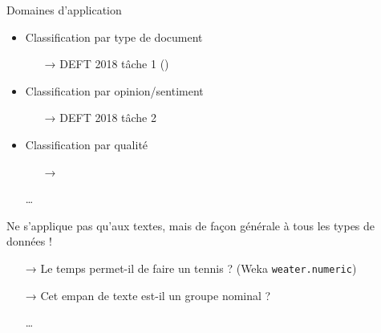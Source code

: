 \documentclass[hyperref={unicode}, xcolor={svgnames}, french]{beamer}
\begin{document}
\begin{frame}{Domaines d'application}
    \begin{itemize}
        \item Classification par type de document
            \begin{itemize}
                \item[→] DEFT 2018 tâche 1 ()
            \end{itemize}
        \item Classification par opinion/sentiment
            \begin{itemize}
                \item[→] DEFT 2018 tâche 2
            \end{itemize}
        \item Classification par qualité
            \begin{itemize}
                \item[→] 
            \end{itemize}
        \item[…]
    \end{itemize}
    Ne s'applique pas qu'aux textes, mais de façon générale à tous les types de données !
    \begin{itemize}
        \item[→] Le temps permet-il de faire un tennis ? (Weka \texttt{weater.numeric})
        \item[→] Cet empan de texte est-il un groupe nominal ?
        \item[…]
    \end{itemize}
\end{frame}
\end{document}
